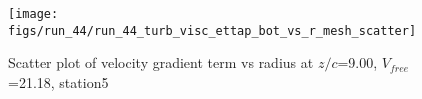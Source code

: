 \begin{figure}[H]
\centering
\texttt{[image: figs/run\_44/run\_44\_turb\_visc\_ettap\_bot\_vs\_r\_mesh\_scatter]}
\caption{Scatter plot of velocity gradient term vs radius at $z/c$=9.00, $V_{free}$=21.18, station5}
\label{fig:run_44_turb_visc_ettap_bot_vs_r_mesh_scatter}
\end{figure}


